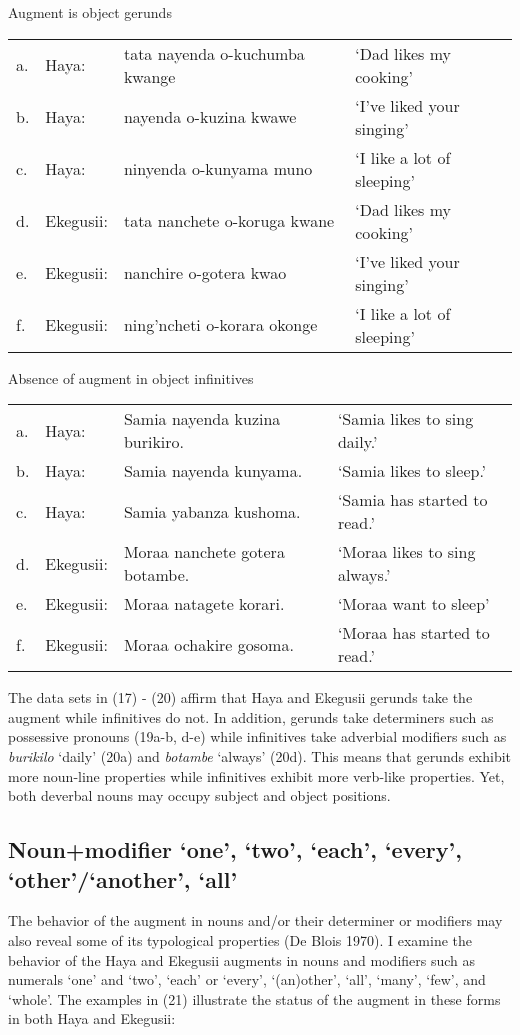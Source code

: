 \documentclass[output=paper]{langscibook}
\begin{document}
\begin{exe}
\ex Augment is object gerunds\\
\label{hayagusii19}
\begin{tabular}{llll}
  a. &	Haya:	&	tata nayenda o-kuchumba kwange &	‘Dad likes my cooking’\\
b. &	Haya:	&	nayenda o-kuzina kwawe	&	‘I’ve liked your singing’	\\
c. &	Haya:	&	ninyenda o-kunyama muno	&	‘I like a lot of sleeping’\\
d. &	Ekegusii: &	tata nanchete o-koruga kwane &		‘Dad likes my cooking’\\
e. &	Ekegusii: &	nanchire o-gotera kwao	&	‘I’ve liked your singing’\\
f. &	Ekegusii: &	ning’ncheti o-korara okonge	&	‘I like a lot of sleeping’\\
\end{tabular}

\ex Absence of augment in object infinitives\\
\label{hayagusii20}
\begin{tabular}{llll}
  a. &	Haya: 	&	Samia nayenda kuzina burikiro. &	‘Samia likes to sing daily.’\\		
b.&	Haya: 	&	Samia nayenda kunyama. 	&	‘Samia likes to sleep.’	\\	
c. &	Haya: 	&	Samia yabanza kushoma. 	&	‘Samia has started to read.’\\	
d. &	Ekegusii: &	Moraa nanchete gotera botambe.&	‘Moraa likes to sing always.’\\
e. &	Ekegusii: &	Moraa natagete korari.	&	‘Moraa want to sleep’\\
f. &	Ekegusii: &	Moraa ochakire gosoma. 	&	‘Moraa has started to read.’\\
\end{tabular}
\end{exe}

The data sets in (17) - (20) affirm that Haya and Ekegusii gerunds take the augment while infinitives do not. In addition, gerunds take determiners such as possessive pronouns (19a-b, d-e) while infinitives take adverbial modifiers such as \textit{burikilo} ‘daily’ (20a) and \textit{botambe} ‘always’ (20d).  This means that gerunds exhibit more noun-line properties while infinitives exhibit more verb-like properties. Yet, both deverbal nouns may occupy subject and object positions.

\subsection{Noun+modifier ‘one’, ‘two’, ‘each’, ‘every’, ‘other’/‘another’, ‘all’}
       	The behavior of the augment in nouns and/or their determiner or modifiers may also reveal some of its typological properties (De Blois 1970). I examine the behavior of the Haya and Ekegusii augments in nouns and  modifiers such as numerals ‘one’ and ‘two’, ‘each’ or ‘every’, ‘(an)other’, ‘all’, ‘many’, ‘few’, and ‘whole’. The examples in (21) illustrate the status of the augment in these forms in both Haya and Ekegusii: 
\end{document}
